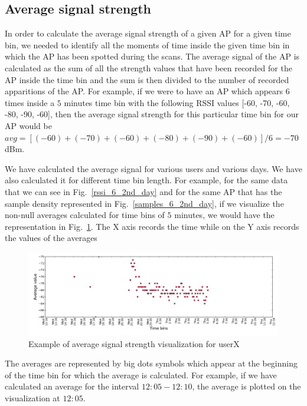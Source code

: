 \subsection{Average signal strength}
\label{average_sig}

In order to calculate the average signal strength of a given AP for a given time
bin, we needed to identify all the moments of time inside the given time bin in which
the AP has been spotted during the scans. The average signal of the AP is
calculated as the sum of all the strength values that have been recorded for the
AP inside the time bin and the sum is then divided to the number of recorded
apparitions of the AP. For example, if we were to have an AP which appears 6
times inside a $5$ minutes time bin with the following RSSI values [-60, -70,
-60, -80, -90, -60], then the average signal strength for this particular time
bin for our AP would be $avg = [(-60) + (-70) + (-60) + (-80) + (-90) +
(-60)] / 6= -70$ dBm.

We have calculated the average signal for various users and various days. We
have also calculated it for different time bin length. For example, for the same
data that we can see in Fig.~\ref{rssi_6_2nd_day} and for the same AP that has
the sample density represented in Fig.~\ref{samples_6_2nd_day}, if we visualize
the non-null averages calculated for time bins of $5$ minutes, we would have the
representation in Fig.~\ref{user_6_avg_1d_5m}. The X axis records the time
while on the Y axis records the values of the averages


\begin{figure}[h]
\centering
\includegraphics[width =\textwidth]{figures/combinations/user_6_sorted_1days_plot_14280_avg_sig.png}
\caption{Example of average signal strength visualization for userX}
\label{user_6_avg_1d_5m}
\end{figure}

The averages are represented by big dots symbols which appear at the beginning
of the time bin for which the average is calculated. For example, if we have
calculated an average for the interval $12:05 - 12:10$, the average is plotted
on the visualization at $12:05$. 

